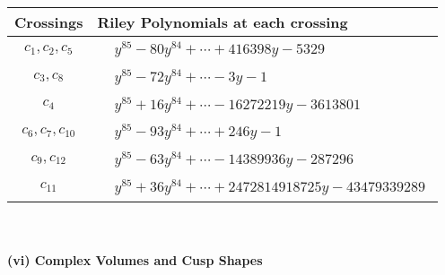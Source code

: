 \documentclass[1p]{elsarticle_modified}
\theoremstyle{definition}
\begin{document}
\begin{tabular}{m{50pt}|m{274pt}}
Crossings & \hspace{64pt}Riley Polynomials at each crossing \\
\hline $$\begin{aligned}c_{1},c_{2},c_{5}\end{aligned}$$&$\begin{aligned}
&y^{85}-80 y^{84}+\cdots+416398 y-5329
\end{aligned}$\\
\hline $$\begin{aligned}c_{3},c_{8}\end{aligned}$$&$\begin{aligned}
&y^{85}-72 y^{84}+\cdots-3 y-1
\end{aligned}$\\
\hline $$\begin{aligned}c_{4}\end{aligned}$$&$\begin{aligned}
&y^{85}+16 y^{84}+\cdots-16272219 y-3613801
\end{aligned}$\\
\hline $$\begin{aligned}c_{6},c_{7},c_{10}\end{aligned}$$&$\begin{aligned}
&y^{85}-93 y^{84}+\cdots+246 y-1
\end{aligned}$\\
\hline $$\begin{aligned}c_{9},c_{12}\end{aligned}$$&$\begin{aligned}
&y^{85}-63 y^{84}+\cdots-14389936 y-287296
\end{aligned}$\\
\hline $$\begin{aligned}c_{11}\end{aligned}$$&$\begin{aligned}
&y^{85}+36 y^{84}+\cdots+2472814918725 y-43479339289
\end{aligned}$\\
\hline
\end{tabular}\\~\\
\newpage\flushleft \textbf{(vi) Complex Volumes and Cusp Shapes}
\end{document}
